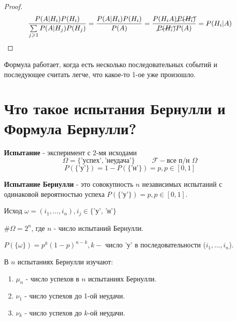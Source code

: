 \begin{proof}
	\[ \frac{P(A|H_i)P(H_i)}{\sum\limits_{j \ge 1} P(A|H_j)P(H_j)} = \frac{P(A|H_i) P(H_i)}{P(A)} = \frac{P(H_iA)\cancel{P(H_i)}}{\cancel{P(H_i)}P(A)} = P(H_i|A) \]
\end{proof}

\begin{figure}[h]
\end{figure}

\begin{remark}
	Формула работает, когда есть несколько последовательных событий и последующее считать легче, что какое-то 1-ое уже произошло.
\end{remark}

\section{Что такое испытания Бернулли и Формула Бернулли?}

\textbf{Испытание} - эксперимент с 2-мя исходами
\[ \Omega = \{\text{'успех'}, \text{'неудача'}\} ~~~~~~~~~~~ \mathcal{F} - \text{все п/н } \Omega \]
\[ P(\{\text{'у'}\}) = 1 - P(\{\text{'н'}\}) = p, p \in [0,1] \]

\textbf{Испытание Бернулли} - это совокупность $n$ независимых испытаний с одинаковой вероятностью успеха $P(\{\text{'у'}\}) = p, p \in [0,1]$.

\noindent Исход $\omega = (i_1, \dots, i_n), i_j \in \{\text{'у', 'н'}\}$

\noindent $\# \Omega = 2^n$, где $n$ - число испытаний Бернулли.

\noindent $P(\{\omega\}) = p^k(1-p)^{n-k}, k - $ число 'у' в последовательности ($i_1, \dots, i_n$).

В $n$ испытаниях Бернулли изучают:
\begin{enumerate}
	\item $\mu_n$ - число успехов в $n$ испытаниях Бернулли.
	\item $\nu_1$ - число успехов до 1-ой неудачи.
	\item $\nu_k$ - число успехов до $k$-ой неудачи.
\end{enumerate}


